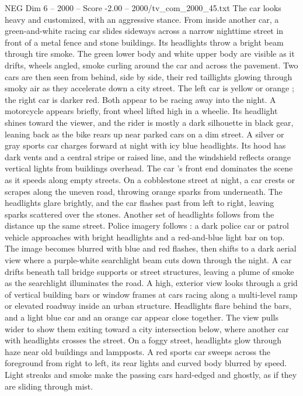 \begin{textsample}{NEG Dim 6 – 2000 – Score -2.00 – 2000/tv\_com\_2000\_45.txt}
The car looks heavy and customized, with an aggressive stance.
From inside another car, a green-and-white racing car slides sideways across a narrow nighttime street in front of a metal fence and stone buildings.
Its headlights throw a bright beam through tire smoke.
The green lower body and white upper body are visible as it drifts, wheels angled, smoke curling around the car and across the pavement.
Two cars are then seen from behind, side by side, their red taillights glowing through smoky air as they accelerate down a city street.
The left car is yellow or orange ; the right car is darker red.
Both appear to be racing away into the night.
A motorcycle appears briefly, front wheel lifted high in a wheelie.
Its headlight shines toward the viewer, and the rider is mostly a dark silhouette in black gear, leaning back as the bike rears up near parked cars on a dim street.
A silver or gray sports car charges forward at night with icy blue headlights.
Its hood has dark vents and a central stripe or raised line, and the windshield reflects orange vertical lights from buildings overhead.
The car ’s front end dominates the scene as it speeds along empty streets.
On a cobblestone street at night, a car crests or scrapes along the uneven road, throwing orange sparks from underneath.
The headlights glare brightly, and the car flashes past from left to right, leaving sparks scattered over the stones.
Another set of headlights follows from the distance up the same street.
Police imagery follows : a dark police car or patrol vehicle approaches with bright headlights and a red-and-blue light bar on top.
The image becomes blurred with blue and red flashes, then shifts to a dark aerial view where a purple-white searchlight beam cuts down through the night.
A car drifts beneath tall bridge supports or street structures, leaving a plume of smoke as the searchlight illuminates the road.
A high, exterior view looks through a grid of vertical building bars or window frames at cars racing along a multi-level ramp or elevated roadway inside an urban structure.
Headlights flare behind the bars, and a light blue car and an orange car appear close together.
The view pulls wider to show them exiting toward a city intersection below, where another car with headlights crosses the street.
On a foggy street, headlights glow through haze near old buildings and lampposts.
A red sports car sweeps across the foreground from right to left, its rear lights and curved body blurred by speed.
Light streaks and smoke make the passing cars hard-edged and ghostly, as if they are sliding through mist.

\end{textsample}
